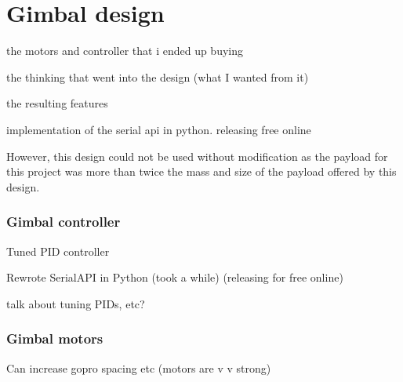 \chapter{Gimbal design}

{\Large \color{red} the motors and controller that i ended up buying}

{\Large \color{red} the thinking that went into the design (what I wanted from it)}

{\Large \color{red} the resulting features }

{\Large \color{red} implementation of the serial api in python. releasing free online}

However, this design could not be used without modification as the payload for this project was more than twice the mass and size of the payload offered by this design.


\subsection{Gimbal controller}
Tuned PID controller

Rewrote SerialAPI in Python (took a while) (releasing for free online)

{\Large \color{red} talk about tuning PIDs, etc?}

\subsection{Gimbal motors}
Can increase gopro spacing etc (motors are v v strong)
